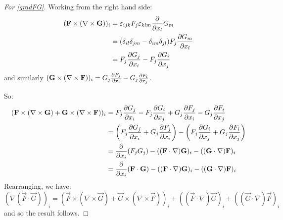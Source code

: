 \documentclass[../main.tex]{subfiles}
\begin{document}
\begin{proof}[For \cref{gradFG}]
  Working from the right hand side:
  \begin{align*}
    (\vec{F} \times (\nabla \times \vec{G}))_i &= \levi_{i j k} F_j \levi_{k l m} \pderiv{}{x_l}G_m \\
                                               &= (\delta_{i l}\delta_{j m} - \delta_{i m}\delta_{j l}) F_j \pderiv{G_m}{x_l} \\
                                               &= F_j \pderiv{G_j}{x_i} - F_j \pderiv{G_i}{x_j}
  \end{align*}
  and similarly $(\vec{G} \times (\nabla \times \vec{F}))_i = G_j \pderiv{F_j}{x_i} - G_j \pderiv{F_i}{x_j}$.

  So:
  \begin{align*}
    (\vec{F} \times (\nabla \times \vec{G}) + \vec{G} \times (\nabla \times \vec{F}))_i &= F_j \pderiv{G_j}{x_i} - F_j \pderiv{G_i}{x_j} + G_j \pderiv{F_j}{x_i} - G_j \pderiv{F_i}{x_j} \\
                                                                                        &= \left(F_j \pderiv{G_j}{x_i} + G_j \pderiv{F_j}{x_i}\right) - \left(F_j \pderiv{G_i}{x_j} + G_j \pderiv{F_i}{x_j}\right) \\
                                                                                        &= \pderiv{}{x_i}(F_jG_j) - ((\vec{F} \cdot \nabla)\vec{G})_i - ((\vec{G} \cdot \nabla)\vec{F})_i \\
                                                                                        &= \pderiv{}{x_i}(\vec{F} \cdot \vec{G}) - ((\vec{F} \cdot \nabla)\vec{G})_i - ((\vec{G} \cdot \nabla)\vec{F})_i
  \end{align*}
  Rearranging, we have:
  \[
    (\nabla(\vec{F} \cdot \vec{G}))_i = (\vec{F} \times (\nabla \times \vec{G}) + \vec{G} \times (\nabla \times \vec{F}))_i + ((\vec{F} \cdot \nabla)\vec{G})_i + ((\vec{G} \cdot \nabla)\vec{F})_i
  \]
  and so the result follows.
\end{proof}
\end{document}
